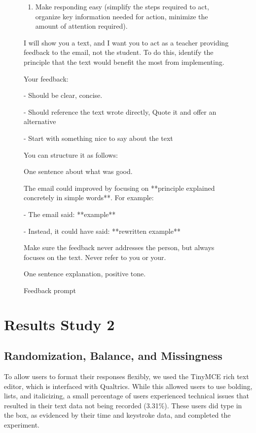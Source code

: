 \documentclass[11pt]{report}
\begin{document}
\begin{append}
\begin{figure}[ht]
\begin{tcolorbox}[colback=blue!5!white, colframe=blue!75!black, title=Feedback prompt]
\begin{enumerate}
\item Make responding easy (simplify the steps required to act, organize key information needed for action, minimize the amount of attention required).
\end{enumerate}

I will show you a text, and I want you to act as a teacher providing feedback to the email, not the student. To do this, identify the principle that the text would benefit the most from implementing.

Your feedback:

- Should be clear, concise.

- Should reference the text wrote directly, Quote it and offer an alternative
    
- Start with something nice to say about the text
\vspace{1em}

You can structure it as follows:

One sentence about what was good.
	
The email could improved by focusing on **principle explained concretely in simple words**. For example:

- The email said: **example**

- Instead, it could have said: **rewritten example** 

Make sure the feedback never addresses the person, but always focuses on the text. Never refer to you or your.

One sentence explanation, positive tone.

\end{tcolorbox}
    \caption{Feedback prompt}
    \label{fig:feedback prompt}
\end{figure}



\section{Results Study 2}

\subsection{Randomization, Balance, and Missingness}
To allow users to format their responses flexibly, we used the TinyMCE rich text editor, which is interfaced with Qualtrics. While this allowed users to use bolding, lists, and italicizing, a small percentage of users experienced technical issues that resulted in their text data not being recorded (3.31\%). These users did type in the box, as evidenced by their time and keystroke data, and completed the experiment. 


\end{append}
\end{document}
